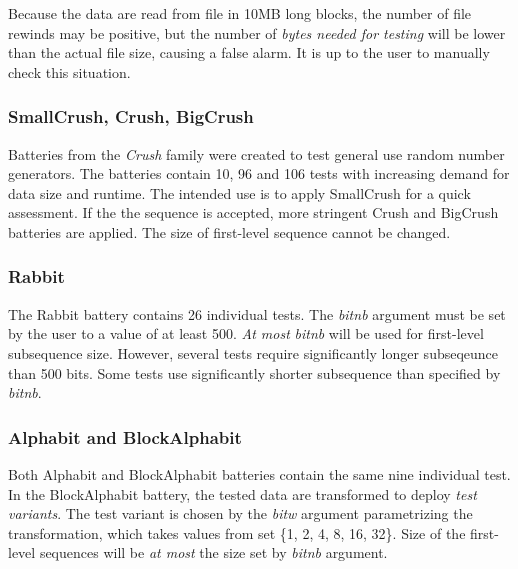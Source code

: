 \documentclass[
  digital,     %
  oneside,     %
  nosansbold,  %
  nocolorbold, %
  nolof,         %
  nolot,         %
]{fithesis4}
\begin{document}
Because the data are read from file in 10MB long blocks, the number of file rewinds may be positive, but the number of \emph{bytes needed for testing} will be lower than the actual file size, causing a false alarm. It is up to the user to manually check this situation. %


\subsubsection{SmallCrush, Crush, BigCrush}
Batteries from the \emph{Crush} family were created to test general use random number generators. The batteries contain 10, 96 and 106 tests with increasing demand for data size and runtime. The intended use is to apply SmallCrush for a quick assessment. If the the sequence is accepted, more stringent Crush and BigCrush batteries are applied. The size of first-level sequence cannot be changed. \cite[p. 242]{tu01_guide}

\subsubsection{Rabbit}
The Rabbit battery contains 26 individual tests. The \emph{bit\textunderscore nb} argument must be set by the user to a value of at least 500. \emph{At most} \emph{bit\textunderscore nb} will be used for first-level subsequence size. \cite[p. 152]{tu01_guide} However, several tests require significantly longer subseqeunce than 500 bits. Some tests use significantly shorter subsequence than specified by \emph{bit\textunderscore nb}.

\subsubsection{Alphabit and BlockAlphabit}
Both Alphabit and BlockAlphabit batteries contain the same nine individual test. In the BlockAlphabit battery, the tested data are transformed to deploy \emph{test variants}. The test variant is chosen by the \emph{bit\textunderscore w} argument parametrizing the transformation, which takes values from set \{1, 2, 4, 8, 16, 32\}. \cite[p. 155]{tu01_guide} Size of the first-level sequences will be \emph{at most} the size set by \emph{bit\textunderscore nb} argument.


\end{document}
